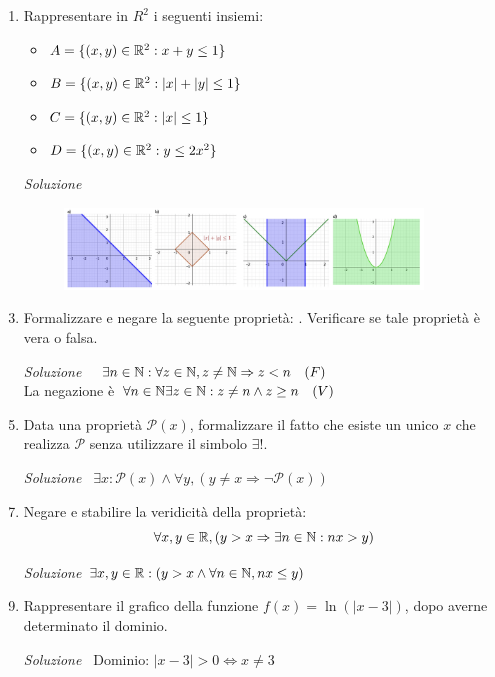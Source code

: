 \documentclass{article}
\begin{document}
\begin{enumerate}[label=\textbf{Esercizio 1.\arabic*.},itemindent=*]
    
    \item Rappresentare in $R^2$ i seguenti insiemi:
    \begin{itemize}
        \item $A=\{(x,y)\in \mathbb{R}^2:x+y\leq1\}$
        \item $B=\{(x,y)\in \mathbb{R}^2:|x|+|y|\leq 1\}$
        \item $C=\{(x,y)\in \mathbb{R}^2: |x|\leq 1\}$
        \item $D=\{(x,y)\in \mathbb{R}^2: y\leq 2x^2\}$
    \end{itemize}
    \item[\textit{\large Soluzione}]~
    \begin{figure}[h]
        \centering
        \includegraphics[width=0.9\textwidth]{Es2.png}
    \end{figure}
    \item Formalizzare e negare la seguente proprietà: . Verificare se tale proprietà è vera o falsa.
    \item[\textit{\large Soluzione}]~ $\exists n\in \mathbb{N} :\forall z\in \mathbb{N}, z\neq \mathbb{N}\Rightarrow z<n~~~(F)$\\
    La negazione è $\forall n\in \mathbb{N}\exists z \in \mathbb{N} :z\neq n\land z\geq n~~~(V)$
    \item Data una proprietà $\mathcal{P}(x)$, formalizzare il fatto che esiste un unico $x$ che realizza $\mathcal{P}$ senza utilizzare il simbolo $\exists!$.
    \item[\textit{\large Soluzione~}]
    $\exists x:\mathcal{P}(x)\land \forall y,(y\neq x\Rightarrow\lnot \mathcal{P}(x))$
    \item Negare e stabilire la veridicità della proprietà: \[\forall x,y \in \mathbb{R},(y>x\Rightarrow \exists n \in \mathbb{N}: n x>y)\]
    \item[\textit{\large Soluzione}]
    $\exists x,y \in \mathbb{R}:(y>x \land \forall n \in \mathbb{N}, nx\leq y)$
    \item Rappresentare il grafico della funzione $f(x)=\ln(|x-3|)$, dopo averne determinato il dominio.
    \item[\textit{\large Soluzione~}] Dominio: $|x-3|>0 \Leftrightarrow x\neq 3$

\end{enumerate}
\end{document}

